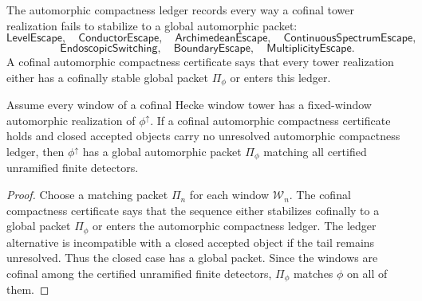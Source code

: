 \begin{definition}
\label{def:unified-reality-automorphic-compactness-ledger}
The automorphic compactness ledger records every way a cofinal tower
realization fails to stabilize to a global automorphic packet:
$$
\mathsf{LevelEscape},\quad
\mathsf{ConductorEscape},\quad
\mathsf{ArchimedeanEscape},\quad
\mathsf{ContinuousSpectrumEscape},
$$
$$
\mathsf{EndoscopicSwitching},\quad
\mathsf{BoundaryEscape},\quad
\mathsf{MultiplicityEscape}.
$$
A cofinal automorphic compactness certificate says that every tower
realization either has a cofinally stable global packet $\Pi_{\phi}$ or
enters this ledger.
\end{definition}

\begin{theorem}
\label{thm:unified-reality-cofinal-trace-realization}
Assume every window of a cofinal Hecke window tower has a fixed-window
automorphic realization of $\phi^{\uparrow}$. If a cofinal automorphic
compactness certificate holds and closed accepted objects carry no
unresolved automorphic compactness ledger, then $\phi^{\uparrow}$ has a
global automorphic packet $\Pi_{\phi}$ matching all certified unramified
finite detectors.
\end{theorem}
\begin{proof}
Choose a matching packet $\Pi_n$ for each window $\mathcal W_n$. The
cofinal compactness certificate says that the sequence either stabilizes
cofinally to a global packet $\Pi_{\phi}$ or enters the automorphic
compactness ledger. The ledger alternative is incompatible with a closed
accepted object if the tail remains unresolved. Thus the closed case
has a global packet. Since the windows are cofinal among the certified
unramified finite detectors, $\Pi_{\phi}$ matches $\phi$ on all of them.
\end{proof}

